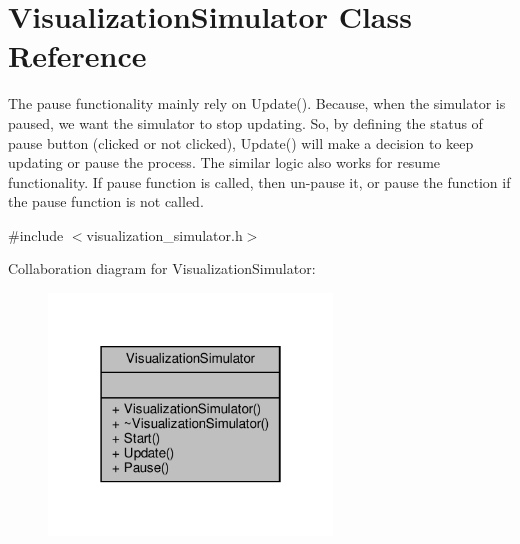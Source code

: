 \hypertarget{classVisualizationSimulator}{}\section{Visualization\+Simulator Class Reference}
\label{classVisualizationSimulator}


The pause functionality mainly rely on Update(). Because, when the simulator is paused, we want the simulator to stop updating. So, by defining the status of pause button (clicked or not clicked), Update() will make a decision to keep updating or pause the process. The similar logic also works for resume functionality. If pause function is called, then un-\/pause it, or pause the function if the pause function is not called.  




{\ttfamily \#include $<$visualization\+\_\+simulator.\+h$>$}



Collaboration diagram for Visualization\+Simulator\+:\nopagebreak
\begin{figure}[H]
\begin{center}
\leavevmode
\includegraphics[width=214pt]{classVisualizationSimulator__coll__graph}
\end{center}
\end{figure}
